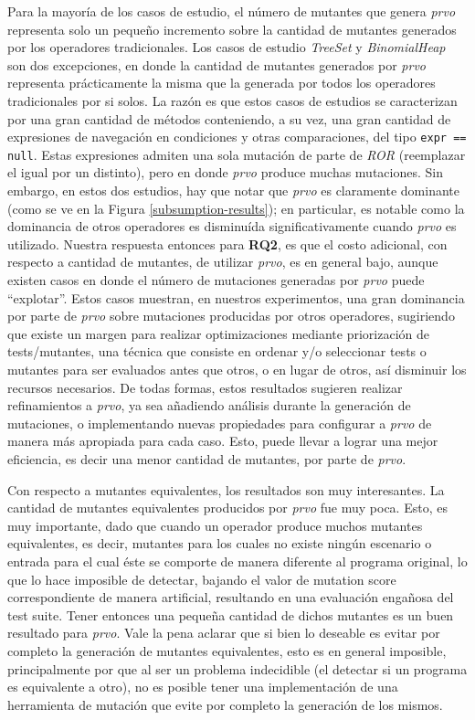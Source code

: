Para la mayor\'ia de los casos de estudio, el n\'umero de mutantes que genera \emph{prvo} representa solo un peque\~no incremento sobre la cantidad de mutantes generados por los operadores tradicionales. Los casos de estudio \emph{TreeSet} y \emph{BinomialHeap} son dos excepciones, en donde la cantidad de mutantes generados por \emph{prvo} representa pr\'acticamente la misma que la generada por todos los operadores tradicionales por si solos. La raz\'on es que estos casos de estudios se caracterizan por una gran cantidad de m\'etodos conteniendo, a su vez, una gran cantidad de expresiones de navegaci\'on en condiciones y otras comparaciones, del tipo \texttt{expr == null}. Estas expresiones admiten una sola mutaci\'on de parte de \emph{ROR} (reemplazar el igual por un distinto), pero en donde \emph{prvo} produce muchas mutaciones. Sin embargo, en estos dos estudios, hay que notar que \emph{prvo} es claramente dominante (como se ve en la Figura \ref{subsumption-results}); en particular, es notable como la dominancia de otros operadores es disminu\'ida significativamente cuando \emph{prvo} es utilizado. Nuestra respuesta entonces para \textbf{RQ2}, es que el costo adicional, con respecto a cantidad de mutantes, de utilizar \emph{prvo}, es en general bajo, aunque existen casos en donde el n\'umero de mutaciones generadas por \emph{prvo} puede ``explotar''. Estos casos muestran, en nuestros experimentos, una gran dominancia por parte de \emph{prvo} sobre mutaciones producidas por otros operadores, sugiriendo que existe un margen para realizar optimizaciones mediante priorizaci\'on de tests/mutantes, una t\'ecnica que consiste en ordenar y/o seleccionar tests o mutantes para ser evaluados antes que otros, o en lugar de otros, as\'i disminuir los recursos necesarios. De todas formas, estos resultados sugieren realizar refinamientos a \emph{prvo}, ya sea a\~nadiendo an\'alisis durante la generaci\'on de mutaciones, o implementando nuevas propiedades para configurar a \emph{prvo} de manera m\'as apropiada para cada caso. Esto, puede llevar a lograr una mejor eficiencia, es decir una menor cantidad de mutantes, por parte de \emph{prvo}.

Con respecto a mutantes equivalentes, los resultados son muy interesantes. La cantidad de mutantes equivalentes producidos por \emph{prvo} fue muy poca. Esto, es muy importante, dado que cuando un operador produce muchos mutantes equivalentes, es decir, mutantes para los cuales no existe ning\'un escenario o entrada para el cual \'este se comporte de manera diferente al programa original, lo que lo hace imposible de detectar, bajando el valor de mutation score correspondiente de manera artificial, resultando en una evaluaci\'on enga\~nosa del test suite. Tener entonces una peque\~na cantidad de dichos mutantes es un buen resultado para \emph{prvo}. Vale la pena aclarar que si bien lo deseable es evitar por completo la generaci\'on de mutantes equivalentes, esto es en general imposible, principalmente por que al ser un problema indecidible (el detectar si un programa es equivalente a otro), no es posible tener una implementaci\'on de una herramienta de mutaci\'on que evite por completo la generaci\'on de los mismos.

